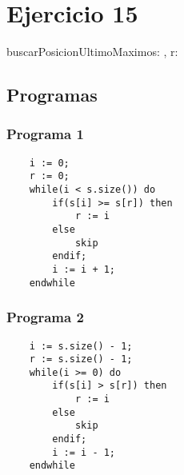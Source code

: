 \documentclass{article}
\begin{document}
\section*{Ejercicio 15}

\begin{proc}{buscarPosicionUltimoMaximo}{\In s: \TLista{\ent}, \Out r: \ent}{}

\end{proc}

\subsection*{Programas}

\subsubsection*{Programa 1}
\begin{verbatim}
    i := 0;
    r := 0;
    while(i < s.size()) do
        if(s[i] >= s[r]) then
            r := i  
        else
            skip
        endif;
        i := i + 1;
    endwhile
\end{verbatim}

\subsubsection*{Programa 2}
\begin{verbatim}
    i := s.size() - 1;
    r := s.size() - 1;
    while(i >= 0) do
        if(s[i] > s[r]) then
            r := i  
        else
            skip
        endif;
        i := i - 1;
    endwhile
\end{verbatim}
\end{document}
